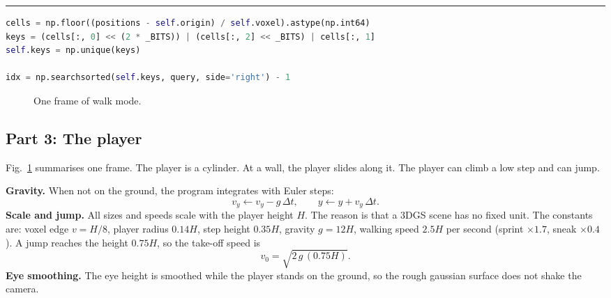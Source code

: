 \documentclass[9pt,twocolumn,a4paper]{extarticle}
\newenvironment{codebox}{\par\vspace{5pt}\noindent\begin{minipage}{\columnwidth}\hrule height 0.8pt\vspace{2pt}}{\end{minipage}\par\vspace{5pt}\noindent\ignorespaces}
\newcommand{\code}[1]{\texttt{#1}}
\begin{document}
\begin{codebox}
\begin{lstlisting}[language=Python,caption={\code{core/physics.py}, \code{CollisionWorld}: voxel keys and ground search},label={lst:voxel}]
cells = np.floor((positions - self.origin) / self.voxel).astype(np.int64)
keys = (cells[:, 0] << (2 * _BITS)) | (cells[:, 2] << _BITS) | cells[:, 1]
self.keys = np.unique(keys)

idx = np.searchsorted(self.keys, query, side='right') - 1
\end{lstlisting}
\end{codebox}

\begin{figure}[H]
\centering
{}
\caption{One frame of walk mode.}
\label{fig:t5}
\end{figure}

\subsection{Part 3: The player}
Fig.~\ref{fig:t5} summarises one frame. The player is a cylinder. At a wall, the player slides along it. The player can climb a low step and can jump.

\textbf{Gravity.} When not on the ground, the program integrates with Euler steps:
\begin{equation}
v_y \leftarrow v_y - g\,\Delta t,
\qquad
y \leftarrow y + v_y\,\Delta t.
\label{eq:euler}
\end{equation}
\textbf{Scale and jump.} All sizes and speeds scale with the player height $H$. The reason is that a 3DGS scene has no fixed unit. The constants are: voxel edge $v=H/8$, player radius $0.14H$, step height $0.35H$, gravity $g=12H$, walking speed $2.5H$ per second (sprint $\times1.7$, sneak $\times0.4$). A jump reaches the height $0.75H$, so the take-off speed is
\begin{equation}
v_0=\sqrt{2\,g\,(0.75H)}.
\label{eq:jump}
\end{equation}
\textbf{Eye smoothing.} The eye height is smoothed while the player stands on the ground, so the rough gaussian surface does not shake the camera.
\end{document}

